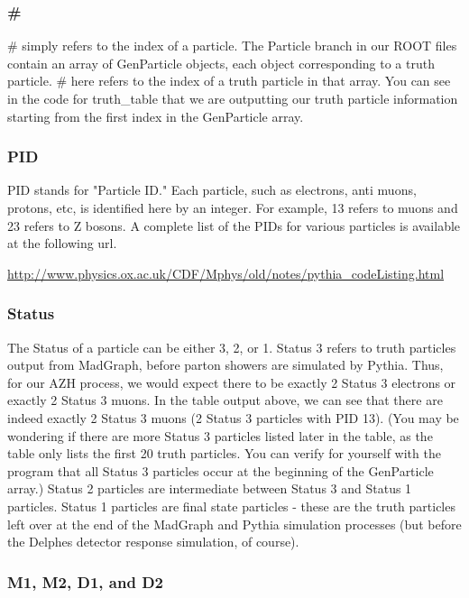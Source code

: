 \documentclass{article}
\begin{document}
\subsubsection{\#}

\# simply refers to the index of a particle. The Particle branch in our ROOT files contain an
array of GenParticle objects, each object corresponding to a truth particle. \# here refers to
the index of a truth particle in that array. You can see in the code for truth\_table that we
are outputting our truth particle information starting from the first index in the GenParticle array.

\subsubsection{PID}

PID stands for "Particle ID." Each particle, such as electrons, anti muons, protons, etc, is
identified here by an integer. For example, 13 refers to muons and 23 refers to Z bosons. A
complete list of the PIDs for various particles is available at the following url.

\bigskip

\url{http://www.physics.ox.ac.uk/CDF/Mphys/old/notes/pythia_codeListing.html}

\subsubsection{Status}

The Status of a particle can be either 3, 2, or 1. Status 3 refers to truth particles output
from MadGraph, before parton showers are simulated by Pythia. Thus, for our AZH process, we
would expect there to be exactly 2 Status 3 electrons or exactly 2 Status 3 muons. In the table
output above, we can see that there are indeed exactly 2 Status 3 muons (2 Status 3 particles
with PID 13). (You may be wondering if there are more Status 3 particles listed later in the
table, as the table only lists the first 20 truth particles. You can verify for yourself with
the program that all Status 3 particles occur at the beginning of the GenParticle array.) Status
2 particles are intermediate between Status 3 and Status 1 particles. Status 1 particles are final
state particles - these are the truth particles left over at the end of the MadGraph and Pythia
simulation processes (but before the Delphes detector response simulation, of course).

\subsubsection{M1, M2, D1, and D2}
\end{document}
